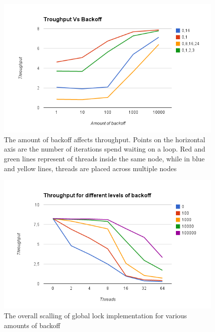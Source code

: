 \begin{figure}
 \centering
  \includegraphics[scale=0.7]{queue_global_backoff_1.png}
\caption{The amount of backoff affects throughput. Points on the horizontal axis are the number of iterations spend waiting on a loop. Red and green lines represent of threads inside the same node, while in blue and yellow lines, threads are placed across multiple nodes}
\label{queue_global_backoff_1}
\end{figure}

\begin{figure}
 \centering
  \includegraphics[scale=0.7]{queue_global_backoff_2.png}
\caption{The overall scalling of global lock implementation for various amounts of backoff}
\label{queue_global_backoff_2}
\end{figure}

